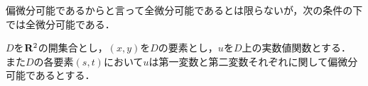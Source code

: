 	偏微分可能であるからと言って全微分可能であるとは限らないが，次の条件の下では全微分可能である．
	
	\begin{screen}
		\begin{thm}[偏導関数が全微分可能なら元の関数も全微分可能]
			$D$を$\mathbf{R}^2$の開集合とし，$(x,y)$を$D$の要素とし，$u$を$D$上の実数値関数とする．
			また$D$の各要素$(s,t)$において$u$は第一変数と第二変数それぞれに関して偏微分可能であるとする．
			
		\end{thm}
	\end{screen}
